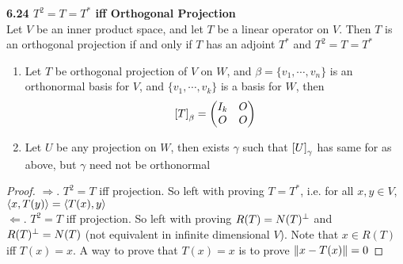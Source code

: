 \documentclass[11pt]{article}
\begin{document}
\begin{theorem*}
    \textbf{6.24 $T^2 = T = T^*$ iff Orthogonal Projection} \\
    Let $V$ be an inner product space, and let $T$ be a linear operator on $V$. Then $T$ is an orthogonal projection if and only if $T$ has an adjoint $T^*$ and $T^2 = T = T^*$
    \begin{enumerate}
        \item Let $T$ be orthogonal projection of $V$ on $W$, and $\beta = \{v_1, \cdots, v_n\}$ is an orthonormal basis for $V$, and $\{v_1, \cdots, v_k\}$ is a basis for $W$, then
        \[
            \left[ T \right]_{\beta} = 
            \begin{pmatrix}
                I_k & O \\
                O & O \\
            \end{pmatrix}    
        \]
        \item Let $U$ be any projection on $W$, then exists $\gamma$ such that $\left[ U \right]_{\gamma}$ has same for as above, but $\gamma$ need not be orthonormal
    \end{enumerate}
    \begin{proof}
        $\Rightarrow$. $T^2=T$ iff projection. So left with proving $T=T^*$, i.e. for all $x,y\in V$, $\langle x,T(y)\rangle = \langle T(x),y\rangle$ \\ 
        $\Leftarrow$. $T^2 =T$ iff projection. So left with proving $R(T) = N(T)^{\perp}$ and $R(T)^{\perp} = N(T)$ (not equivalent in infinite dimensional $V$). Note that $x\in R(T)$ iff $T(x)=x$. A way to prove that $T(x) = x$ is to prove $\left\lVert x - T(x)\right\rVert = 0$
    \end{proof}
\end{theorem*}
\end{document}
